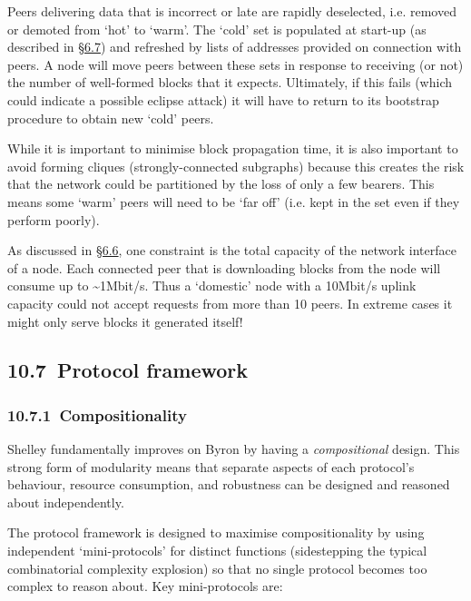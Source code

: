 \documentclass[11pt,a4paper]{article}
\begin{document}
Peers delivering data that is incorrect or late are rapidly deselected,
i.e. removed or demoted from `hot' to `warm'. The `cold' set is
populated at start-up (as described in
\protect\hyperlink{decentralisation-design}{{§6.7}}) and refreshed by
lists of addresses provided on connection with peers. A node will move
peers between these sets in response to receiving (or not) the number of
well-formed blocks that it expects. Ultimately, if this fails (which
could indicate a possible eclipse attack) it will have to return to its
bootstrap procedure to obtain new `cold' peers.

While it is important to minimise block propagation time, it is also
important to avoid forming cliques (strongly-connected subgraphs)
because this creates the risk that the network could be partitioned by
the loss of only a few bearers. This means some `warm' peers will need
to be `far off' (i.e. kept in the set even if they perform poorly).

As discussed in
\protect\hyperlink{decentralisation-constraints}{{§6.6}}, one constraint
is the total capacity of the network interface of a node. Each connected
peer that is downloading blocks from the node will consume up to
\textasciitilde{}1Mbit/s. Thus a `domestic' node with a 10Mbit/s uplink
capacity could not accept requests from more than 10 peers. In extreme
cases it might only serve blocks it generated itself!

\hypertarget{protocol-framework}{%
\subsection{​10.7​~Protocol framework}\label{protocol-framework}}

\hypertarget{compositionality}{%
\subsubsection{​10.7.1​~Compositionality}\label{compositionality}}

Shelley fundamentally improves on Byron by having a \emph{compositional}
design. This strong form of modularity means that separate aspects of
each protocol's behaviour, resource consumption, and robustness can be
designed and reasoned about independently.

The protocol framework is designed to maximise compositionality by using
independent `mini-protocols' for distinct functions (sidestepping the
typical combinatorial complexity explosion) so that no single protocol
becomes too complex to reason about. Key mini-protocols are:
\end{document}
